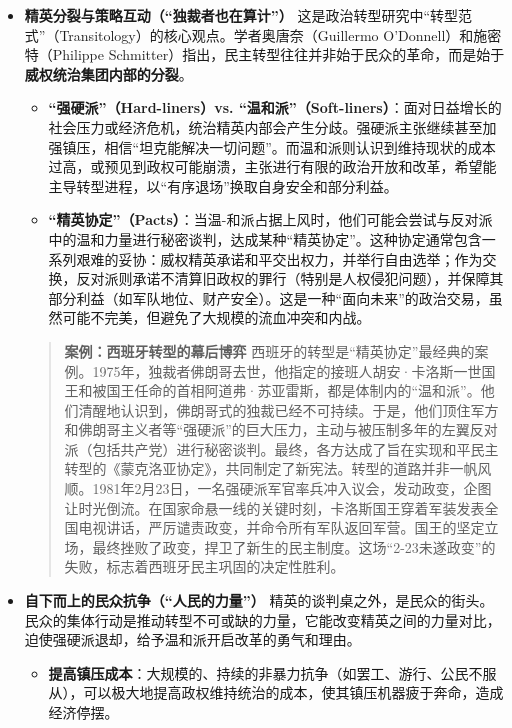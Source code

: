 \begin{itemize}
    \item \textbf{精英分裂与策略互动（“独裁者也在算计”）}
    这是政治转型研究中“转型范式”（Transitology）的核心观点。学者奥唐奈（Guillermo O'Donnell）和施密特（Philippe Schmitter）指出，民主转型往往并非始于民众的革命，而是始于\textbf{威权统治集团内部的分裂}。
    \begin{itemize}
        \item \textbf{“强硬派”（Hard-liners）vs. “温和派”（Soft-liners）}：面对日益增长的社会压力或经济危机，统治精英内部会产生分歧。强硬派主张继续甚至加强镇压，相信“坦克能解决一切问题”。而温和派则认识到维持现状的成本过高，或预见到政权可能崩溃，主张进行有限的政治开放和改革，希望能主导转型进程，以“有序退场”换取自身安全和部分利益。
        \item \textbf{“精英协定”（Pacts）}：当温-和派占据上风时，他们可能会尝试与反对派中的温和力量进行秘密谈判，达成某种“精英协定”。这种协定通常包含一系列艰难的妥协：威权精英承诺和平交出权力，并举行自由选举；作为交换，反对派则承诺不清算旧政权的罪行（特别是人权侵犯问题），并保障其部分利益（如军队地位、财产安全）。这是一种“面向未来”的政治交易，虽然可能不完美，但避免了大规模的流血冲突和内战。
    \end{itemize}
    \begin{quote}
    \textbf{案例：西班牙转型的幕后博弈}
    西班牙的转型是“精英协定”最经典的案例。1975年，独裁者佛朗哥去世，他指定的接班人胡安·卡洛斯一世国王和被国王任命的首相阿道弗·苏亚雷斯，都是体制内的“温和派”。他们清醒地认识到，佛朗哥式的独裁已经不可持续。于是，他们顶住军方和佛朗哥主义者等“强硬派”的巨大压力，主动与被压制多年的左翼反对派（包括共产党）进行秘密谈判。最终，各方达成了旨在实现和平民主转型的《蒙克洛亚协定》，共同制定了新宪法。转型的道路并非一帆风顺。1981年2月23日，一名强硬派军官率兵冲入议会，发动政变，企图让时光倒流。在国家命悬一线的关键时刻，卡洛斯国王穿着军装发表全国电视讲话，严厉谴责政变，并命令所有军队返回军营。国王的坚定立场，最终挫败了政变，捍卫了新生的民主制度。这场“2-23未遂政变”的失败，标志着西班牙民主巩固的决定性胜利。
    \end{quote}
    \item \textbf{自下而上的民众抗争（“人民的力量”）}
    精英的谈判桌之外，是民众的街头。民众的集体行动是推动转型不可或缺的力量，它能改变精英之间的力量对比，迫使强硬派退却，给予温和派开启改革的勇气和理由。
    \begin{itemize}
        \item \textbf{提高镇压成本}：大规模的、持续的非暴力抗争（如罢工、游行、公民不服从），可以极大地提高政权维持统治的成本，使其镇压机器疲于奔命，造成经济停摆。

\end{itemize}
\end{itemize}
